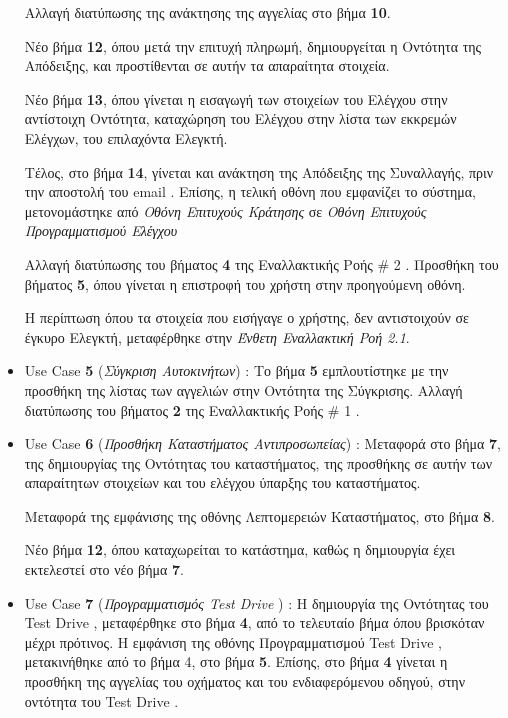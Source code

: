 \documentclass{../ol-softwaremanual}
\begin{document}
\begin{itemize}
		Αλλαγή διατύπωσης της ανάκτησης της αγγελίας στο βήμα \textbf{10}.
		
		Νέο βήμα \textbf{12}, όπου μετά την επιτυχή πληρωμή, δημιουργείται η Οντότητα της Απόδειξης, και προστίθενται σε αυτήν τα απαραίτητα στοιχεία.
		
		Νέο βήμα \textbf{13}, όπου γίνεται η εισαγωγή των στοιχείων του Ελέγχου στην αντίστοιχη Οντότητα, καταχώρηση του Ελέγχου στην λίστα των εκκρεμών Ελέγχων, του επιλαχόντα Ελεγκτή.
		
		Τέλος, στο βήμα \textbf{14}, γίνεται και ανάκτηση της Απόδειξης της Συναλλαγής, πριν την αποστολή του \en email \gr. Επίσης, η τελική οθόνη που εμφανίζει το σύστημα, μετονομάστηκε από \textit{Οθόνη Επιτυχούς Κράτησης} σε \textit{Οθόνη Επιτυχούς Προγραμματισμού Ελέγχου}	

		Αλλαγή διατύπωσης του βήματος \textbf{4} της Εναλλακτικής Ροής \en \# 2 \gr. Προσθήκη του βήματος \textbf{5}, όπου γίνεται η επιστροφή του χρήστη στην  προηγούμενη οθόνη.
		
		Η περίπτωση όπου τα στοιχεία που εισήγαγε ο χρήστης, δεν αντιστοιχούν σε έγκυρο Ελεγκτή, μεταφέρθηκε στην \textit{Ένθετη Εναλλακτική Ροή 2.1}.
	
		\item \en Use Case \textbf{5} \gr (\textit{Σύγκριση Αυτοκινήτων}) : Το βήμα \textbf{5} εμπλουτίστηκε με την προσθήκη της λίστας των αγγελιών στην Οντότητα της Σύγκρισης. Αλλαγή διατύπωσης του βήματος \textbf{2} της Εναλλακτικής Ροής \en \# 1 \gr.
		
				
		\item \en Use Case \textbf{6} \gr (\textit{Προσθήκη Καταστήματος Αντιπροσωπείας}) : Μεταφορά στο βήμα \textbf{7}, της δημιουργίας της Οντότητας του καταστήματος, της προσθήκης σε αυτήν των απαραίτητων στοιχείων και του ελέγχου ύπαρξης του καταστήματος. 
		
		Μεταφορά της εμφάνισης της οθόνης Λεπτομερειών Καταστήματος, στο βήμα \textbf{8}.
		
		Νέο βήμα \textbf{12}, όπου καταχωρείται το κατάστημα, καθώς η δημιουργία έχει εκτελεστεί στο νέο βήμα \textbf{7}.
		
		\item \en Use Case \textbf{7} \gr (\textit{Προγραμματισμός \en Test Drive \gr}) : Η δημιουργία της Οντότητας του \en Test Drive \gr, μεταφέρθηκε στο βήμα \textbf{4}, από το τελευταίο βήμα όπου βρισκόταν μέχρι πρότινος. Η εμφάνιση της οθόνης Προγραμματισμού \en Test Drive \gr, μετακινήθηκε από το βήμα 4, στο βήμα \textbf{5}. Επίσης, στο βήμα \textbf{4} γίνεται η προσθήκη της αγγελίας του οχήματος και του ενδιαφερόμενου οδηγού, στην οντότητα του \en Test Drive \gr.
		

\end{itemize}
\end{document}
